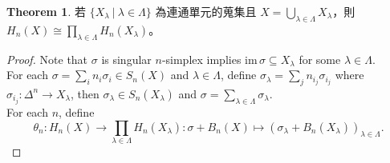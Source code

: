 \documentclass[12pt]{article}
\theoremstyle{definition}
\newtheorem{theorem}[definition]{Theorem}
\newcommand\<{\langle}
\renewcommand\>{\rangle}
\newcommand\im{\mathrm{im}\hspace{2pt}}
\begin{document}
\begin{CJK}{UTF8}{bsmi}
\begin{theorem}
    若 $\{X_\lambda\ |\ \lambda\in\Lambda\}$ 為連通單元的蒐集且 $X=\bigcup_{\lambda\in\Lambda}X_\lambda$，則 $H_n(X)\cong\prod_{\lambda\in\Lambda}H_n(X_\lambda)$。
\end{theorem}
\begin{proof}
    Note that $\sigma$ is singular $n$-simplex implies $\im\sigma\subseteq X_\lambda$ for some $\lambda\in\Lambda$. \\
    For each $\sigma=\sum_i n_i\sigma_i\in S_n(X)$ and $\lambda\in\Lambda$, define $\sigma_\lambda=\sum_j n_{i_j}\sigma_{i_j}$ where $\sigma_{i_j}:\Delta^n\to X_\lambda$, then $\sigma_\lambda\in S_n(X_\lambda)$ and $\sigma=\sum_{\lambda\in\Lambda}\sigma_\lambda$. \\
    For each $n$, define
    \[
        \theta_n:H_n(X)\to\prod_{\lambda\in\Lambda}H_n(X_\lambda):\sigma+B_n(X)\mapsto(\sigma_\lambda+B_n(X_\lambda))_{\lambda\in\Lambda}.
    \]
\end{proof}

\end{CJK}
\end{document}
